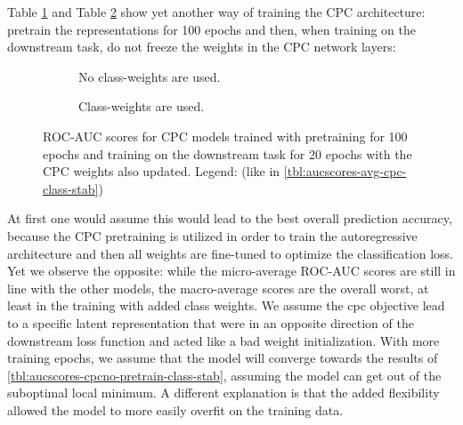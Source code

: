 Table \ref{tbl:aucscores-cpc-pretrain-unfrozen-noclassweights-stab} and Table \ref{tbl:aucscores-cpc-pretrain-unfrozen-classweights-stab} show yet another way of training the CPC architecture: pretrain the representations for 100 epochs and then, when training on the downstream task, do not freeze the weights in the CPC network layers:
\begin{figure}[H]
	\begin{subfigure}[t]{0.48\textwidth}
		
		\caption{No class-weights are used.}
		\label{tbl:aucscores-cpc-pretrain-unfrozen-noclassweights-stab}
	\end{subfigure}
	\vline
	\begin{subfigure}[t]{0.48\textwidth}
		
		\caption{Class-weights are used.}
		\label{tbl:aucscores-cpc-pretrain-unfrozen-classweights-stab}
	\end{subfigure}
	\caption*{\small ROC-AUC scores for CPC models trained with pretraining for 100 epochs and training on the downstream task for 20 epochs with the CPC weights also updated.  Legend: (like in \autoref{tbl:aucscores-avg-cpc-class-stab})}
	\label{tbl:aucscores-cpc-pretrain-unfrozen-stab}
\end{figure}
At first one would assume this would lead to the best overall prediction accuracy, because the CPC pretraining is utilized in order to train the autoregressive architecture and then all weights are fine-tuned to optimize the classification loss. Yet we observe the opposite: while the micro-average ROC-AUC scores are still in line with the other models, the macro-average scores are the overall worst, at least in the training with added class weights. We assume the cpc objective lead to a specific latent representation that were in an opposite direction of the downstream loss function and acted like a bad weight initialization. With more training epochs, we assume that the model will converge towards the results of \autoref{tbl:aucscores-cpcno-pretrain-class-stab}, assuming the model can get out of the suboptimal local minimum. A different explanation is that the added flexibility allowed the model to more easily overfit on the training data.

